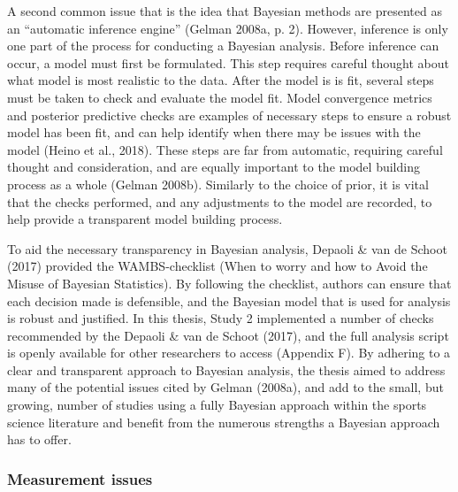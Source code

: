 \documentclass[
  english,
  man,floatsintext]{apa6}
\begin{document}
A second common issue that is the idea that Bayesian methods are presented as an \enquote{automatic inference engine} (Gelman 2008a, p. 2).
However, inference is only one part of the process for conducting a Bayesian analysis.
Before inference can occur, a model must first be formulated.
This step requires careful thought about what model is most realistic to the data.
After the model is is fit, several steps must be taken to check and evaluate the model fit.
Model convergence metrics and posterior predictive checks are examples of necessary steps to ensure a robust model has been fit, and can help identify when there may be issues with the model (Heino et al., 2018).
These steps are far from automatic, requiring careful thought and consideration, and are equally important to the model building process as a whole (Gelman 2008b).
Similarly to the choice of prior, it is vital that the checks performed, and any adjustments to the model are recorded, to help provide a transparent model building process.

To aid the necessary transparency in Bayesian analysis, Depaoli \& van de Schoot (2017) provided the WAMBS-checklist (When to worry and how to Avoid the Misuse of Bayesian Statistics).
By following the checklist, authors can ensure that each decision made is defensible, and the Bayesian model that is used for analysis is robust and justified.
In this thesis, Study 2 implemented a number of checks recommended by the Depaoli \& van de Schoot (2017), and the full analysis script is openly available for other researchers to access (Appendix F).
By adhering to a clear and transparent approach to Bayesian analysis, the thesis aimed to address many of the potential issues cited by Gelman (2008a), and add to the small, but growing, number of studies using a fully Bayesian approach within the sports science literature and benefit from the numerous strengths a Bayesian approach has to offer.

\hypertarget{measurement-issues-1}{%
\subsubsection{Measurement issues}\label{measurement-issues-1}}
\end{document}
